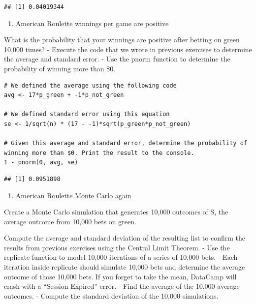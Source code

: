 \documentclass[
]{article}
\providecommand{\tightlist}{%
  \setlength{\itemsep}{0pt}\setlength{\parskip}{0pt}}
\begin{document}
\begin{verbatim}
## [1] 0.04019344
\end{verbatim}

\begin{enumerate}
\def\labelenumi{\arabic{enumi}.}
\setcounter{enumi}{7}
\tightlist
\item
  American Roulette winnings per game are positive
\end{enumerate}

What is the probability that your winnings are positive after betting on
green 10,000 times? - Execute the code that we wrote in previous
exercises to determine the average and standard error. - Use the pnorm
function to determine the probability of winning more than \$0.

\begin{verbatim}
# We defined the average using the following code
avg <- 17*p_green + -1*p_not_green

# We defined standard error using this equation
se <- 1/sqrt(n) * (17 - -1)*sqrt(p_green*p_not_green)

# Given this average and standard error, determine the probability of winning more than $0. Print the result to the console.
1 - pnorm(0, avg, se)
\end{verbatim}

\begin{verbatim}
## [1] 0.0951898
\end{verbatim}

\begin{enumerate}
\def\labelenumi{\arabic{enumi}.}
\setcounter{enumi}{8}
\tightlist
\item
  American Roulette Monte Carlo again
\end{enumerate}

Create a Monte Carlo simulation that generates 10,000 outcomes of S, the
average outcome from 10,000 bets on green.

Compute the average and standard deviation of the resulting list to
confirm the results from previous exercises using the Central Limit
Theorem. - Use the replicate function to model 10,000 iterations of a
series of 10,000 bets. - Each iteration inside replicate should simulate
10,000 bets and determine the average outcome of those 10,000 bets. If
you forget to take the mean, DataCamp will crash with a ``Session
Expired'' error. - Find the average of the 10,000 average outcomes. -
Compute the standard deviation of the 10,000 simulations.
\end{document}
